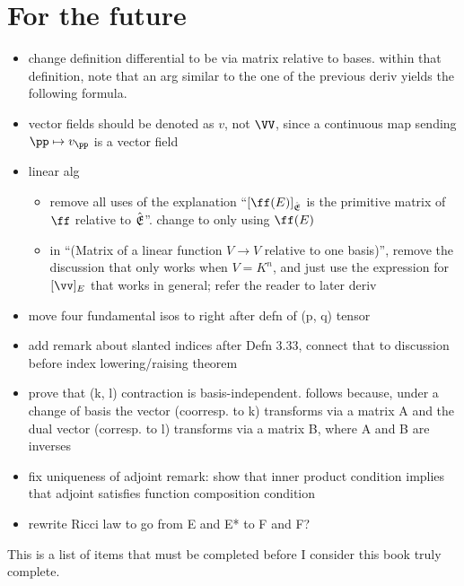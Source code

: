 \chapter*{For the future}

\begin{itemize}
    \item change definition differential to be via matrix relative to bases. within that definition, note that an arg similar to the one of the previous deriv yields the following formula.
    \item vector fields should be denoted as $v$, not $\VV$, since a continuous map sending $\pp \mapsto v_\pp$ is a vector field
    \item linear alg
    \begin{itemize}
        \item remove all uses of the explanation ``$[\ff(E)]_{\sE}$ is the primitive matrix of $\ff$ relative to ${\hat{\mathfrak{E}}}$''. change to only using $\ff(E)$
        \item in ``(Matrix of a linear function $V \rightarrow V$ relative to one basis)'', remove the discussion that only works when $V = K^n$, and just use the expression for $[\vv]_E$ that works in general; refer the reader to later deriv
    \end{itemize}
    \item move four fundamental isos to right after defn of (p, q) tensor
    \item add remark about slanted indices after Defn 3.33, connect that to discussion before index lowering/raising theorem
    \item prove that (k, l) contraction is basis-independent. follows because, under a change of basis the vector (coorresp. to k) transforms via a matrix A and the dual vector (corresp. to l) transforms via a matrix B, where A and B are inverses
    \item fix uniqueness of adjoint remark: show that inner product condition implies that adjoint satisfies function composition condition
    \item rewrite Ricci law to go from E and E* to F and F?
\end{itemize}

\vspace{.5cm}

This is a list of items that must be completed before I consider this book truly complete.

